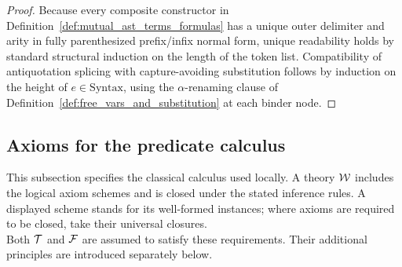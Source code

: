 \begin{proof}
Because every composite constructor in Definition~\ref{def:mutual_ast_terms_formulas} has a unique outer delimiter and arity in fully parenthesized prefix/infix normal form, unique readability holds by standard structural induction on the length of the token list. Compatibility of antiquotation splicing with capture-avoiding substitution follows by induction on the height of $e \in \mathrm{Syntax}$, using the $\alpha$-renaming clause of Definition~\ref{def:free_vars_and_substitution} at each binder node.
\end{proof}


\pagebreak
\subsection{Axioms for the predicate calculus}
This subsection specifies the classical calculus used locally. A theory
${\mathcal{W}}$ includes the logical axiom schemes and is closed under the stated
inference rules. A displayed scheme stands for its well-formed instances;
where axioms are required to be closed, take their universal closures.\\
Both $\mathcal{T}$ and ${\mathcal{F}}$ are assumed to satisfy these requirements. Their
additional principles are introduced separately below.
